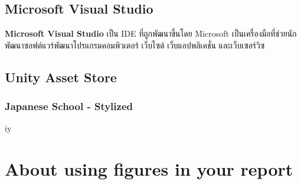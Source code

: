\subsection{Microsoft Visual Studio}
\subsubitem \textbf{Microsoft Visual Studio} เป็น IDE ที่ถูกพัฒนาขึ้นโดย Microsoft เป็นเครื่องมือที่ช่วยนักพัฒนาซอฟต์แวร์พัฒนาโปรแกรมคอมพิวเตอร์ เว็บไซต์ เว็บแอปพลิเคชั่น และเว็บเซอร์วิซ

\subsection{Unity Asset Store}
\subsubitem \subsubsection{Japanese School - Stylized}iy



\section{About using figures in your report}

\newcommand{\loremipsum}{
  \textit{Lorem ipsum dolor sit amet, consectetur adipisicing elit, sed do
  eiusmod tempor incididunt ut labore et dolore magna aliqua. Ut enim ad
  minim veniam, quis nostrud exercitation ullamco laboris nisi ut
  aliquip ex ea commodo consequat. Duis aute irure dolor in
  reprehenderit in voluptate velit esse cillum dolore eu fugiat nulla
  pariatur. Excepteur sint occaecat cupidatat non proident, sunt in
  culpa qui officia deserunt mollit anim id est laborum.}\par}


